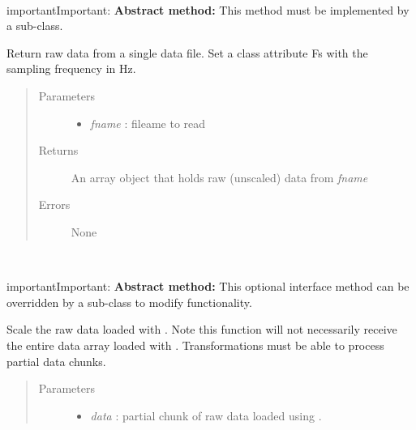 \documentclass[letterpaper,10pt,english]{sphinxmanual}
\begin{document}
\begin{fulllineitems}
\begin{fulllineitems}
\end{fulllineitems}


\begin{fulllineitems}
\label{api-doc/mosaic.meta:mosaic.metaTrajIO.metaTrajIO.readdata}~
\begin{notice}{important}{Important:}
\textbf{Abstract method:} This method must be implemented by a sub-class.
\end{notice}

Return raw data from a single data file. Set a class 
attribute Fs with the sampling frequency in Hz.
\begin{quote}\begin{description}
\item[{Parameters}] \leavevmode\begin{itemize}
\item {} 
\emph{fname} :  fileame to read

\end{itemize}

\item[{Returns}] \leavevmode
An array object that holds raw (unscaled) data from \emph{fname}

\item[{Errors}] \leavevmode
None

\end{description}\end{quote}

\end{fulllineitems}


\begin{fulllineitems}
\label{api-doc/mosaic.meta:mosaic.metaTrajIO.metaTrajIO.scaleData}~
\begin{notice}{important}{Important:}
\textbf{Abstract method:} This optional interface method can be overridden by a sub-class to modify functionality.
\end{notice}

Scale the raw data loaded with {\hyperref[api\string-doc/mosaic.meta:mosaic.metaTrajIO.metaTrajIO.readdata]{\emph{}}}. Note this function will not necessarily receive the entire data array loaded with {\hyperref[api\string-doc/mosaic.meta:mosaic.metaTrajIO.metaTrajIO.readdata]{\emph{}}}. Transformations must be able to process partial data chunks.
\begin{quote}\begin{description}
\item[{Parameters}] \leavevmode\begin{itemize}
\item {} 
\emph{data} : partial chunk of raw data loaded using {\hyperref[api\string-doc/mosaic.meta:mosaic.metaTrajIO.metaTrajIO.readdata]{\emph{}}}.


\end{itemize}
\end{description}
\end{quote}
\end{fulllineitems}
\end{fulllineitems}
\end{document}
